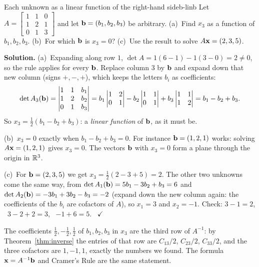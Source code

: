 \documentclass[11pt]{article}
\begin{document}
\begin{exmp}{Each unknown as a linear function of the right-hand side}{b-linb}
Let $A=\begin{bmatrix}1&1&0\\1&2&1\\0&1&3\end{bmatrix}$ and let $\mathbf{b}=(b_1,b_2,b_3)$ be arbitrary. (a)~Find $x_3$ as a function of $b_1,b_2,b_3$. (b)~For which $\mathbf{b}$ is $x_3=0$? (c)~Use the result to solve $A\mathbf{x}=(2,3,5)$.

\textbf{Solution.} (a)~Expanding along row $1$, $\det A=1(6-1)-1(3-0)=2\neq0$, so the rule applies for every $\mathbf{b}$. Replace column $3$ by $\mathbf{b}$ and expand down that new column (signs $+,-,+$), which keeps the letters $b_i$ as coefficients:
\[
\det A_3(\mathbf{b})=\begin{vmatrix}1&1&b_1\\1&2&b_2\\0&1&b_3\end{vmatrix}=b_1\begin{vmatrix}1&2\\0&1\end{vmatrix}-b_2\begin{vmatrix}1&1\\0&1\end{vmatrix}+b_3\begin{vmatrix}1&1\\1&2\end{vmatrix}=b_1-b_2+b_3.
\]
So $x_3=\tfrac12(b_1-b_2+b_3)$: a \emph{linear function} of $\mathbf{b}$, as it must be.

(b)~$x_3=0$ exactly when $b_1-b_2+b_3=0$. For instance $\mathbf{b}=(1,2,1)$ works: solving $A\mathbf{x}=(1,2,1)$ gives $x_3=0$. The vectors $\mathbf{b}$ with $x_3=0$ form a plane through the origin in $\mathbb{R}^3$.

(c)~For $\mathbf{b}=(2,3,5)$ we get $x_3=\frac12(2-3+5)=2$. The other two unknowns come the same way, from $\det A_1(\mathbf{b})=5b_1-3b_2+b_3=6$ and $\det A_2(\mathbf{b})=-3b_1+3b_2-b_3=-2$ (expand down the new column again: the coefficients of the $b_i$ are cofactors of $A$), so $x_1=3$ and $x_2=-1$. Check: $3-1=2$, \ $3-2+2=3$, \ $-1+6=5$. \ $\checkmark$

The coefficients $\tfrac12,-\tfrac12,\tfrac12$ of $b_1,b_2,b_3$ in $x_3$ are the third row of $A^{-1}$: by Theorem~\ref{thm:inverse} the entries of that row are $C_{13}/2$, $C_{23}/2$, $C_{33}/2$, and the three cofactors are $1,-1,1$, exactly the numbers we found. The formula $\mathbf{x}=A^{-1}\mathbf{b}$ and Cramer's Rule are the same statement.
\end{exmp}
\end{document}
